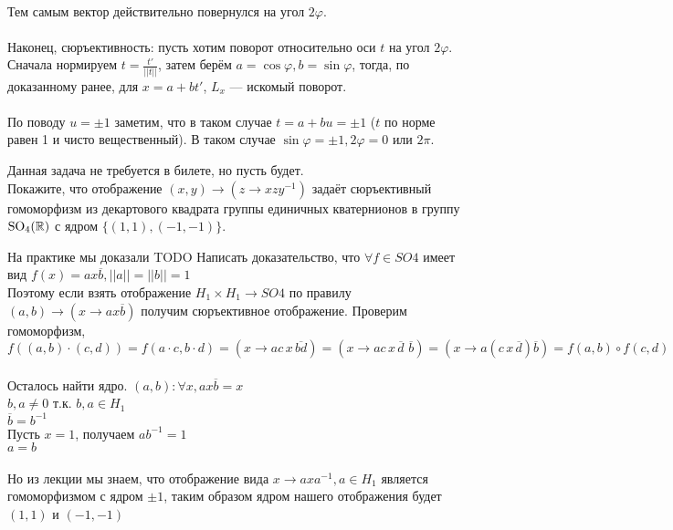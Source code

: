 \\
Тем самым вектор действительно повернулся на угол $2 \varphi$.\\
\\
Наконец, сюръективность: пусть хотим поворот относительно оси $t$ на угол $2\varphi$. Сначала нормируем $t = \frac{t'}{||t||}$, затем берём $a = \cos \varphi, b = \sin \varphi$, тогда, по доказанному ранее, для $x = a + bt'$, $L_x$ --- искомый поворот.\\  
\\
По поводу $u = \pm 1$ заметим, что в таком случае $t = a + bu = \pm 1$ ($t$ по норме равен 1 и чисто вещественный). В таком случае $\sin \varphi = \pm 1, 2\varphi = 0 \text{ или }2\pi$.\\
\endproof

Данная задача не требуется в билете, но пусть будет.\\
\zd
Покажите, что отображение $(x,y) \to (z \to xzy^{-1})$ задаёт сюръективный гомоморфизм из декартового квадрата группы единичных кватернионов в группу $\operatorname{SO}_4(\mathbb{R})$ с ядром $\{(1,1),(-1,-1)\}$.
\ezd

На практике мы доказали {\color{red}TODO Написать доказательство}, что $\forall f \in SO4$ имеет вид $f(x) = ax\overline{b}, ||a|| = ||b|| = 1$\\
Поэтому если взять отображение $H_1 \times H_1 \to SO4$ по правилу $(a, b) \to (x \to a x \overline{b})$ получим сюръективное отображение. Проверим гомоморфизм, $f((a,b) \cdot (c,d)) = f(a\cdot c, b \cdot d) = (x \to ac \, x \, \overline{bd}) = (x \to ac \, x \, \overline{d}\, \,\overline{b}) = (x \to a(c \, x \, \overline{d})\overline{b}) = f(a,b) \circ f(c,d)$\\
\\
Осталось найти ядро. $(a,b) : \forall x, ax\overline{b} = x$\\
$b,a \ne 0$ т.к. $b, a \in H_1$\\
$\overline{b} = b^{-1}$\\
Пусть $x = 1$, получаем $ab^{-1} = 1$\\
$a = b$\\
\\
Но из лекции мы знаем, что отображение вида $x \to axa^{-1}, a \in H_1$ является гомоморфизмом с ядром $\pm 1$, таким образом ядром нашего отображения будет $(1, 1)$ и $(-1, -1)$\\
\\